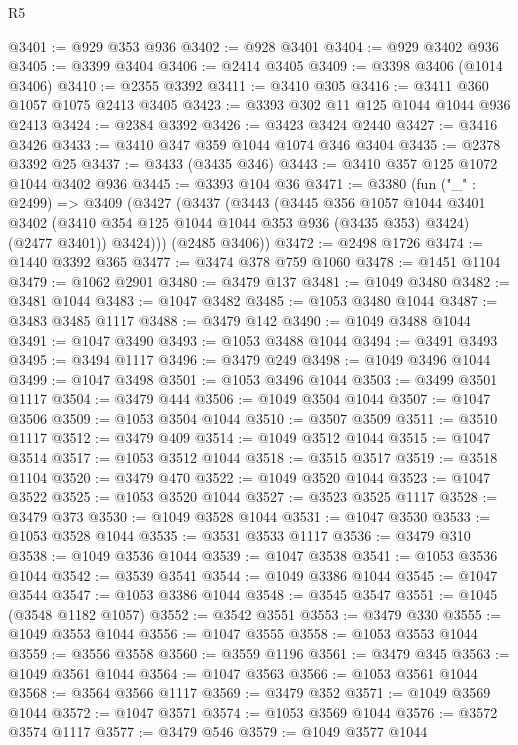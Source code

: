 \begin{lexlean}{R5}
\begin{coremodule}
@3401 := @929 @353 @936
@3402 := @928 @3401
@3404 := @929 @3402 @936
@3405 := @3399 @3404
@3406 := @2414 @3405
@3409 := @3398 @3406 (@1014 @3406)
@3410 := @2355 @3392
@3411 := @3410 @305
@3416 := @3411 @360 @1057 @1075 @2413 @3405
@3423 := @3393 @302 @11 @125 @1044 @1044 @936 @2413
@3424 := @2384 @3392
@3426 := @3423 @3424 @2440
@3427 := @3416 @3426
@3433 := @3410 @347 @359 @1044 @1074 @346 @3404
@3435 := @2378 @3392 @25
@3437 := @3433 (@3435 @346)
@3443 := @3410 @357 @125 @1072 @1044 @3402 @936
@3445 := @3393 @104 @36
@3471 := @3380
    (fun ("_" : @2499) =>
    @3409
      (@3427
        (@3437
          (@3443
            (@3445
              @356
              @1057
              @1044
              @3401
              @3402
              (@3410 @354 @125 @1044 @1044 @353 @936 (@3435 @353) @3424)
              (@2477 @3401))
            @3424)))
      (@2485 @3406))
@3472 := @2498 @1726
@3474 := @1440 @3392 @365
@3477 := @3474 @378 @759 @1060
@3478 := @1451 @1104
@3479 := @1062 @2901
@3480 := @3479 @137
@3481 := @1049 @3480
@3482 := @3481 @1044
@3483 := @1047 @3482
@3485 := @1053 @3480 @1044
@3487 := @3483 @3485 @1117
@3488 := @3479 @142
@3490 := @1049 @3488 @1044
@3491 := @1047 @3490
@3493 := @1053 @3488 @1044
@3494 := @3491 @3493
@3495 := @3494 @1117
@3496 := @3479 @249
@3498 := @1049 @3496 @1044
@3499 := @1047 @3498
@3501 := @1053 @3496 @1044
@3503 := @3499 @3501 @1117
@3504 := @3479 @444
@3506 := @1049 @3504 @1044
@3507 := @1047 @3506
@3509 := @1053 @3504 @1044
@3510 := @3507 @3509
@3511 := @3510 @1117
@3512 := @3479 @409
@3514 := @1049 @3512 @1044
@3515 := @1047 @3514
@3517 := @1053 @3512 @1044
@3518 := @3515 @3517
@3519 := @3518 @1104
@3520 := @3479 @470
@3522 := @1049 @3520 @1044
@3523 := @1047 @3522
@3525 := @1053 @3520 @1044
@3527 := @3523 @3525 @1117
@3528 := @3479 @373
@3530 := @1049 @3528 @1044
@3531 := @1047 @3530
@3533 := @1053 @3528 @1044
@3535 := @3531 @3533 @1117
@3536 := @3479 @310
@3538 := @1049 @3536 @1044
@3539 := @1047 @3538
@3541 := @1053 @3536 @1044
@3542 := @3539 @3541
@3544 := @1049 @3386 @1044
@3545 := @1047 @3544
@3547 := @1053 @3386 @1044
@3548 := @3545 @3547
@3551 := @1045 (@3548 @1182 @1057)
@3552 := @3542 @3551
@3553 := @3479 @330
@3555 := @1049 @3553 @1044
@3556 := @1047 @3555
@3558 := @1053 @3553 @1044
@3559 := @3556 @3558
@3560 := @3559 @1196
@3561 := @3479 @345
@3563 := @1049 @3561 @1044
@3564 := @1047 @3563
@3566 := @1053 @3561 @1044
@3568 := @3564 @3566 @1117
@3569 := @3479 @352
@3571 := @1049 @3569 @1044
@3572 := @1047 @3571
@3574 := @1053 @3569 @1044
@3576 := @3572 @3574 @1117
@3577 := @3479 @546
@3579 := @1049 @3577 @1044

\end{coremodule}
\end{lexlean}
